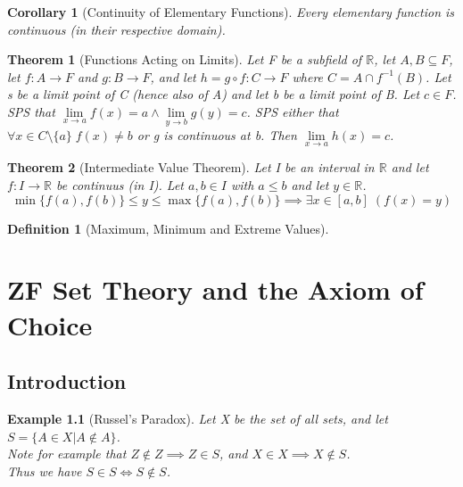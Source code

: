 \documentclass[11pt, oneside]{book}
\theoremstyle{break}
\newtheorem{thm}{Theorem}[section]
\newtheorem{crly}{Corollary}[thm]
\newtheorem{defn}{Definition}[section]
\newtheorem{eg}{Example}[section]
\newcommand{\bb}[1]{\mathbb{#1}}		%
\begin{document}
\begin{crly}[Continuity of Elementary Functions]
	Every elementary function is continuous (in their respective domain).
\end{crly}

\begin{thm}[Functions Acting on Limits]
	Let F be a subfield of $\bb{R}$, let $A, B \subseteq F$, let $f: A \to F$ and $g: B \to F$, and let $h = g \circ f : C \to F$ where $C = A \cap f^{-1}(B)$. Let s be a limit point of C (hence also of A) and let b be a limit point of B. Let $c \in F$. SPS that $\lim\limits_{x \to a} f(x) = a \land \lim\limits_{y \to b} g(y) = c$. SPS either that $\forall x \in C \setminus \{a\} \; f(x) \neq b$ or g is continuous at b. Then $\lim\limits_{x \to a} h(x) = c$.
\end{thm}

\begin{thm}[Intermediate Value Theorem]
	Let I be an interval in $\bb{R}$ and let $f: I \to \bb{R}$ be continuus (in I). Let $a, b \in I$ with $a \leq b$ and let $y \in \bb{R}$.
	\[
		\min \{f(a), f(b)\} \leq y \leq \max \{f(a), f(b)\} \implies \exists x \in [a, b] \; (f(x) = y)
	\]
\end{thm}

\begin{defn}[Maximum, Minimum and Extreme Values]
	
\end{defn}










\appendix

\chapter{ZF Set Theory and the Axiom of Choice}\label{apdxA}
\section{Introduction}
\begin{eg}[Russel's Paradox]\label{russel_paradox}
	Let X be the set of all sets, and let $S = \{ A \in X | A \notin A\}$.\\
	Note for example that $Z \notin Z \implies Z \in S$, and $X \in X \implies X \notin S$.\\
	Thus we have $S \in S \iff S \notin S$.
\end{eg}
\end{document}
